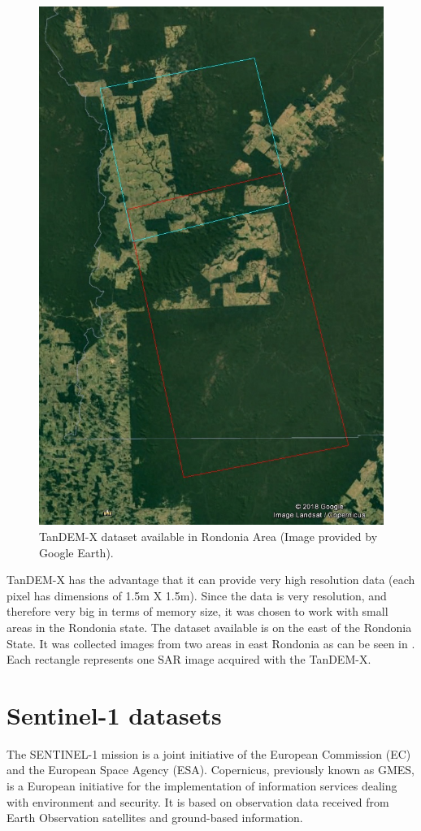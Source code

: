 \begin{figure}[H]
    \centering
    \includegraphics[width=0.6\linewidth]{Chapter2-real/tandem_dataset.jpg}
    \caption{TanDEM-X dataset available in Rondonia Area (Image provided by Google Earth).}
    \label{fig:tandem_dataset}
\end{figure}{}
TanDEM-X has the advantage that it can provide very high resolution data (each pixel has dimensions of  1.5m X 1.5m). Since the data is very resolution, and therefore very big in terms of memory size, it was chosen to work with small areas in the Rondonia state.
The dataset available is on the east of the Rondonia State. It was collected images from two areas in east Rondonia as can be seen in . Each rectangle represents one SAR image acquired with the TanDEM-X.

\section{Sentinel-1 datasets}
\par
The SENTINEL-1 mission is a joint initiative of the European Commission (EC) and the European Space Agency (ESA). Copernicus, previously known as GMES, is a European initiative for the implementation of information services dealing with environment and security. It is based on observation data received from Earth Observation satellites and ground-based information.

